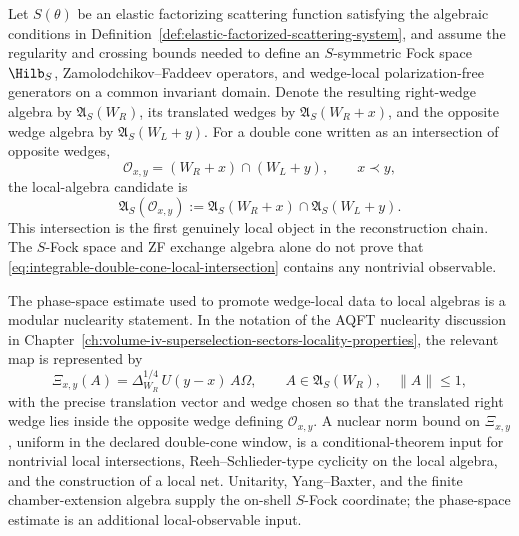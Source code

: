 \begin{remark}
\label{ca:integrable-wedge-local-reconstruction-budget}
Let \(S(\theta)\) be an elastic factorizing scattering function satisfying
the algebraic conditions in
Definition~\ref{def:elastic-factorized-scattering-system}, and assume the
regularity and crossing bounds needed to define an \(S\)-symmetric Fock space
\(\Hilb_S\), Zamolodchikov--Faddeev operators, and wedge-local
polarization-free generators on a common invariant domain.  Denote the
resulting right-wedge algebra by \(\mathfrak A_S(W_R)\), its translated
wedges by \(\mathfrak A_S(W_R+x)\), and the opposite wedge algebra by
\(\mathfrak A_S(W_L+y)\).  For a double cone written as an intersection of
opposite wedges,
\[
  \mathcal O_{x,y}=(W_R+x)\cap(W_L+y),
  \qquad x\prec y ,
\]
the local-algebra candidate is
\begin{equation}
  \mathfrak A_S(\mathcal O_{x,y})
  :=
  \mathfrak A_S(W_R+x)\cap\mathfrak A_S(W_L+y).
  \label{eq:integrable-double-cone-local-intersection}
\end{equation}
This intersection is the first genuinely local object in the reconstruction
chain.  The \(S\)-Fock space and ZF exchange algebra alone do not prove that
\eqref{eq:integrable-double-cone-local-intersection} contains any nontrivial
observable.

The phase-space estimate used to promote wedge-local data to local algebras
is a modular nuclearity statement.  In the notation of the AQFT nuclearity
discussion in
Chapter~\ref{ch:volume-iv-superselection-sectors-locality-properties}, the
relevant map is represented by
\begin{equation}
  \Xi_{x,y}(A)
  =
  \Delta_{W_R}^{1/4}\,U(y-x)\,A\Omega,
  \qquad
  A\in\mathfrak A_S(W_R),\quad \|A\|\le 1 ,
  \label{eq:integrable-modular-nuclearity-map}
\end{equation}
with the precise translation vector and wedge chosen so that the translated
right wedge lies inside the opposite wedge defining
\(\mathcal O_{x,y}\).  A nuclear norm bound on \(\Xi_{x,y}\), uniform in the
declared double-cone window, is a conditional-theorem input for nontrivial
local intersections, Reeh--Schlieder-type cyclicity on the local algebra, and
the construction of a local net.  Unitarity, Yang--Baxter, and the finite
chamber-extension algebra supply the on-shell \(S\)-Fock coordinate; the
phase-space estimate is an additional local-observable input.


\end{remark}
